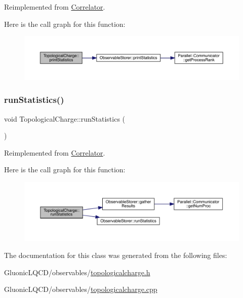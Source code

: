 Reimplemented from \mbox{\hyperlink{class_correlator_a2168d677f547769784781d2e2aaa53cf}{Correlator}}.

Here is the call graph for this function\+:\nopagebreak
\begin{figure}[H]
\begin{center}
\leavevmode
\includegraphics[width=350pt]{class_topological_charge_ad56263921d283d315b04ab40c9594a2c_cgraph}
\end{center}
\end{figure}
\mbox{\label{class_topological_charge_ab9afadb9f37e638c0a168ebab5d41353}} 
\subsubsection{\texorpdfstring{runStatistics()}{runStatistics()}}
{\footnotesize\ttfamily void Topological\+Charge\+::run\+Statistics (\begin{DoxyParamCaption}{ }\end{DoxyParamCaption})\hspace{0.3cm}{\ttfamily [virtual]}}



Reimplemented from \mbox{\hyperlink{class_correlator_a35197b1d12b62ef30b79c0138a26456e}{Correlator}}.

Here is the call graph for this function\+:\nopagebreak
\begin{figure}[H]
\begin{center}
\leavevmode
\includegraphics[width=350pt]{class_topological_charge_ab9afadb9f37e638c0a168ebab5d41353_cgraph}
\end{center}
\end{figure}


The documentation for this class was generated from the following files\+:\begin{DoxyCompactItemize}
\item 
Gluonic\+L\+Q\+C\+D/observables/\mbox{\hyperlink{topologicalcharge_8h}{topologicalcharge.\+h}}\item 
Gluonic\+L\+Q\+C\+D/observables/\mbox{\hyperlink{topologicalcharge_8cpp}{topologicalcharge.\+cpp}}\end{DoxyCompactItemize}
